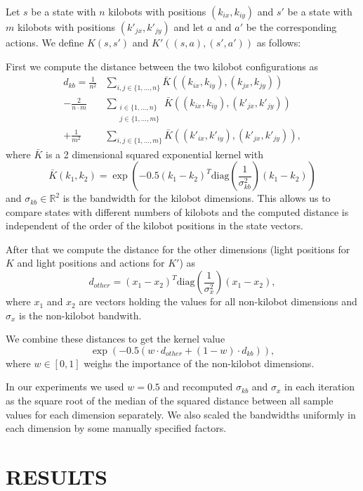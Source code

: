 \documentclass[twoside]{article}
\begin{document}
Let $s$ be a state with $n$ kilobots with positions $(k_{ix}, k_{iy})$
and $s'$ be a state with $m$ kilobots with positions $(k'_{jx}, k'_{jy})$ and
let $a$ and $a'$ be the corresponding actions.
We define $K(s, s')$ and $K'((s, a), (s', a'))$ as follows:

First we compute the distance between the two kilobot configurations as
\begin{align*}
d_{kb} =
  \frac{1}{n^2} &\sum_{i,j \in \{1,\dots,n\}}
    \bar{K}((k_{ix}, k_{iy}), (k_{jx}, k_{jy})) \\
- \frac{2}{n \cdot m} &\sum_{\substack{i \in \{1,\dots,n\}\\j \in \{1,\dots,m\}}}
    \bar{K}((k_{ix}, k_{iy}), (k'_{jx}, k'_{jy})) \\
+ \frac{1}{m^2} &\sum_{i,j \in \{1,\dots,m\}}
    \bar{K}((k'_{ix}, k'_{iy}), (k'_{jx}, k'_{jy})),
\end{align*}
where $\bar{K}$ is a 2 dimensional squared exponential kernel with
$$
\bar{K}(k_1, k_2) =
    \exp \left(-0.5 (k_1 - k_2)^T
    \mathrm{diag}\left(\frac{1}{\sigma_{kb}^2}\right) (k_1 - k_2)\right)
$$
and $\sigma_{kb} \in \mathbb{R}^2$ is the bandwidth for the kilobot dimensions.
This allows us to compare states with different numbers of kilobots and the
computed distance is independent of the order of the kilobot positions in the
state vectors.

After that we compute the distance for the other dimensions (light positions for
$K$ and light positions and actions for $K'$) as
$$
d_{other} = (x_1 - x_2)^T \mathrm{diag}\left(\frac{1}{\sigma_{x}^2}\right) (x_1 - x_2),
$$
where $x_1$ and $x_2$ are vectors holding the values for all non-kilobot
dimensions and $\sigma_x$ is the non-kilobot bandwith.

We combine these distances to get the kernel value
$$
\exp(-0.5 (w \cdot d_{other} + (1 - w) \cdot d_{kb})),
$$
where $w \in [0,1]$ weighs the importance of the non-kilobot dimensions.

In our experiments we used $w = 0.5$ and recomputed $\sigma_{kb}$ and $\sigma_x$
in each iteration as the square root of the median of the squared distance
between all sample values for each dimension separately. We also scaled the
bandwidths uniformly in each dimension by some manually specified factors.

\section{RESULTS}
\end{document}
